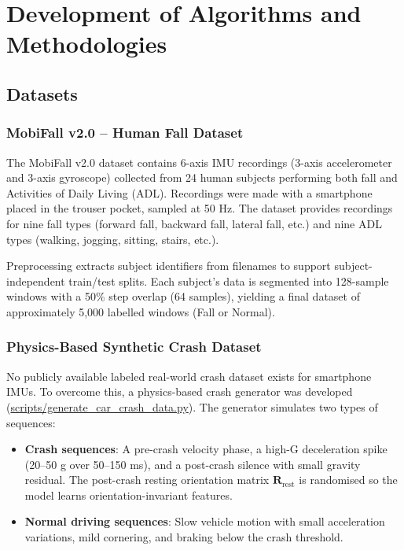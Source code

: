 \chapter{Development of Algorithms and Methodologies}
\label{sec:3}

\section{Datasets}
\label{sec:datasets}

\subsection{MobiFall v2.0 -- Human Fall Dataset}

The MobiFall v2.0 dataset \citep{mobifall2024} contains 6-axis IMU recordings (3-axis accelerometer and 3-axis gyroscope) collected from 24 human subjects performing both fall and Activities of Daily Living (ADL). Recordings were made with a smartphone placed in the trouser pocket, sampled at 50 Hz. The dataset provides recordings for nine fall types (forward fall, backward fall, lateral fall, etc.) and nine ADL types (walking, jogging, sitting, stairs, etc.).

Preprocessing extracts subject identifiers from filenames to support subject-independent train/test splits. Each subject's data is segmented into 128-sample windows with a 50\% step overlap (64 samples), yielding a final dataset of approximately 5,000 labelled windows (Fall or Normal).

\subsection{Physics-Based Synthetic Crash Dataset}

No publicly available labeled real-world crash dataset exists for smartphone IMUs. To overcome this, a physics-based crash generator was developed (\url{scripts/generate_car_crash_data.py}). The generator simulates two types of sequences:

\begin{itemize}
    \item \textbf{Crash sequences}: A pre-crash velocity phase, a high-G deceleration spike (20--50 g over 50--150 ms), and a post-crash silence with small gravity residual. The post-crash resting orientation matrix $\mathbf{R}_{\text{rest}}$ is randomised so the model learns orientation-invariant features.
    \item \textbf{Normal driving sequences}: Slow vehicle motion with small acceleration variations, mild cornering, and braking below the crash threshold.
\end{itemize}

